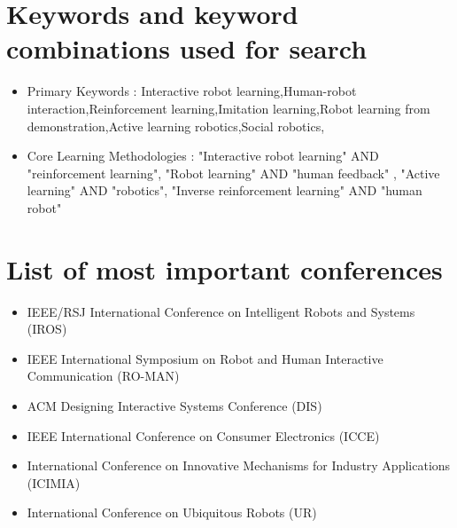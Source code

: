 \documentclass[report.tex]{subfiles}
\begin{document}
    
        \section{Keywords and keyword combinations used for search}
        \begin{itemize}
            \item {Primary Keywords : Interactive robot learning,Human-robot interaction,Reinforcement learning,Imitation learning,Robot learning from demonstration,Active learning robotics,Social robotics,}
            \item {Core Learning Methodologies : "Interactive robot learning" AND "reinforcement learning", "Robot learning" AND "human feedback" , "Active learning" AND "robotics", "Inverse reinforcement learning" AND "human robot" }
        \end{itemize}
        
        \section{List of most important conferences}
        \begin{itemize}
            \item  {IEEE/RSJ International Conference on Intelligent Robots and Systems (IROS)}
            \item   {IEEE International Symposium on Robot and Human Interactive Communication (RO-MAN)}
            \item {ACM Designing Interactive Systems Conference (DIS)}
            \item {IEEE International Conference on Consumer Electronics (ICCE)}
            \item { International Conference on Innovative Mechanisms for Industry Applications (ICIMIA)}
            \item {International Conference on Ubiquitous Robots (UR)}
        \end{itemize}
\end{document}
